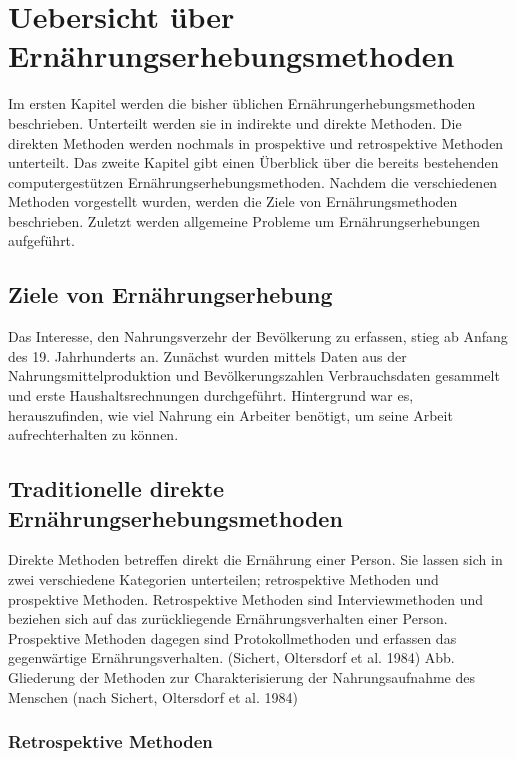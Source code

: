 \section{Uebersicht über Ernährungserhebungsmethoden}

Im ersten Kapitel werden die bisher üblichen Ernährungerhebungsmethoden beschrieben. Unterteilt werden sie in indirekte und direkte Methoden. Die direkten Methoden werden nochmals in prospektive und retrospektive Methoden unterteilt. Das zweite Kapitel gibt einen Überblick über die bereits bestehenden computergestützen Ernährungserhebungsmethoden. Nachdem die verschiedenen Methoden vorgestellt wurden, werden die Ziele von Ernährungsmethoden beschrieben. Zuletzt werden allgemeine Probleme um Ernährungserhebungen aufgeführt. 

\subsection{Ziele von Ernährungserhebung}

Das Interesse, den Nahrungsverzehr der Bevölkerung zu erfassen, stieg ab Anfang des 19. Jahrhunderts an. Zunächst wurden mittels Daten aus der Nahrungsmittelproduktion und Bevölkerungszahlen Verbrauchsdaten gesammelt und erste Haushaltsrechnungen durchgeführt. Hintergrund war es, herauszufinden, wie viel Nahrung ein Arbeiter benötigt, um seine Arbeit aufrechterhalten zu können. 

\subsection{Traditionelle direkte Ernährungserhebungsmethoden}

Direkte Methoden betreffen direkt die Ernährung einer Person.  Sie lassen sich in zwei verschiedene Kategorien unterteilen; retrospektive Methoden und prospektive Methoden. Retrospektive Methoden sind Interviewmethoden und beziehen sich auf das zurückliegende Ernährungsverhalten einer Person.  Prospektive Methoden dagegen sind Protokollmethoden und erfassen das gegenwärtige Ernährungsverhalten. (Sichert, Oltersdorf et al. 1984)
Abb. Gliederung der Methoden zur Charakterisierung der Nahrungsaufnahme des Menschen (nach Sichert, Oltersdorf et al. 1984)

\subsubsection{Retrospektive Methoden}


